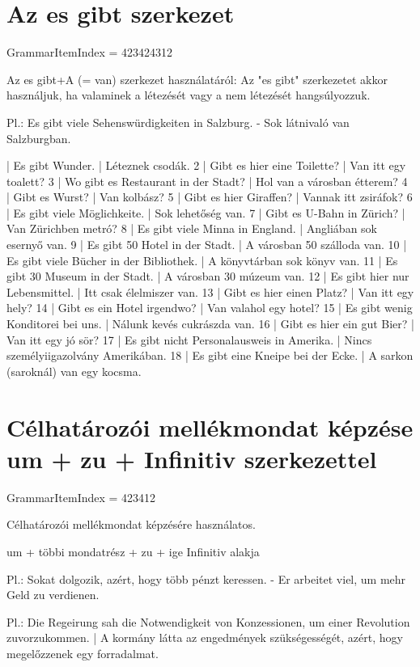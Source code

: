 \documentclass{article}
\newenvironment{desc}{\verbatim}{\endverbatim}
\newenvironment{exmp}{\verbatim}{\endverbatim}
\begin{document}
\section{Az es gibt szerkezet}

GrammarItemIndex = 423424312

\begin{desc}
Az es gibt+A (= van) szerkezet használatáról: Az "es gibt" szerkezetet akkor használjuk, ha valaminek a létezését vagy a nem létezését hangsúlyozzuk.

Pl.: Es gibt viele Sehenswürdigkeiten in Salzburg. - Sok látnivaló van Salzburgban.
\end{desc}

\begin{exmp}
1 | Es gibt Wunder. | Léteznek csodák.
2 | Gibt es hier eine Toilette? | Van itt egy toalett?
3 | Wo gibt es Restaurant in der Stadt? | Hol van a városban étterem?
4 | Gibt es Wurst? | Van kolbász?
5 | Gibt es hier Giraffen? | Vannak itt zsiráfok?
6 | Es gibt viele Möglichkeite. | Sok lehetőség van.
7 | Gibt es U-Bahn in Zürich? | Van Zürichben metró?
8 | Es gibt viele Minna in England. | Angliában sok esernyő van.
9 | Es gibt 50 Hotel in der Stadt. | A városban 50 szálloda van.
10 | Es gibt viele Bücher in der Bibliothek. | A könyvtárban sok könyv van.
11 | Es gibt 30 Museum in der Stadt. | A városban 30 múzeum van.
12 | Es gibt hier nur Lebensmittel. | Itt csak élelmiszer van.
13 | Gibt es hier einen Platz? | Van itt egy hely?
14 | Gibt es ein Hotel irgendwo? | Van valahol egy hotel?
15 | Es gibt wenig Konditorei bei uns. | Nálunk kevés cukrászda van.
16 | Gibt es hier ein gut Bier? | Van itt egy jó sör?
17 | Es gibt nicht Personalausweis in Amerika. | Nincs személyiigazolvány Amerikában.
18 | Es gibt eine Kneipe bei der Ecke. | A sarkon (saroknál) van egy kocsma.
\end{exmp}

\section{Célhatározói mellékmondat képzése um + zu + Infinitiv szerkezettel}

GrammarItemIndex = 423412

\begin{desc}
Célhatározói mellékmondat képzésére használatos.

um + többi mondatrész + zu + ige Infinitiv alakja

Pl.: Sokat dolgozik, azért, hogy több pénzt keressen. - Er arbeitet viel, um mehr Geld zu verdienen.

Pl.: Die Regeirung sah die Notwendigkeit von Konzessionen, um einer Revolution zuvorzukommen. | A kormány látta az engedmények szükségességét, azért, hogy megelőzzenek egy forradalmat.
\end{desc}
\end{document}
